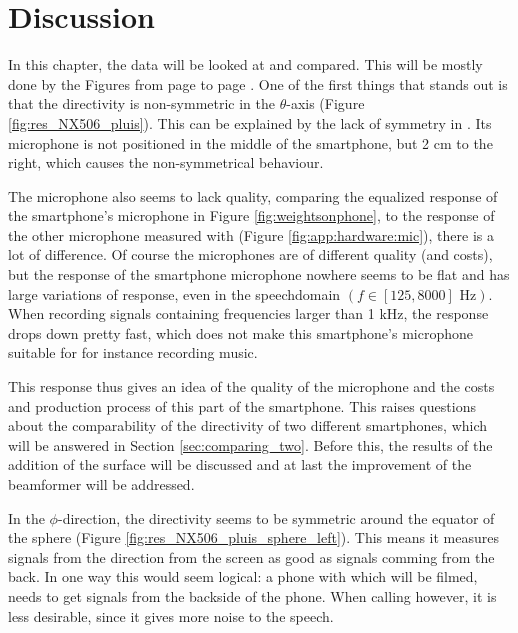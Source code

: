 \section{Discussion}
\label{sec:discussion}

In this chapter, the data will be looked at and compared.
This will be mostly done by the Figures from page \pageref{fig:res_NX506_pluis} to page \pageref{fig:res_NX501_pluis}.
One of the first things that stands out is that the directivity is non-symmetric in the $\theta$-axis (Figure \ref{fig:res_NX506_pluis}).
This can be explained by the lack of symmetry in \nexus.
Its microphone is not positioned in the middle of the smartphone, but 2 cm to the right, which causes the non-symmetrical behaviour.

The microphone also seems to lack quality, comparing the equalized response of the smartphone's microphone in Figure \ref{fig:weightsonphone}, to the response of the other microphone measured with (Figure \ref{fig:app:hardware:mic}), there is a lot of difference.
Of course the microphones are of different quality (and costs), but the response of the smartphone microphone nowhere seems to be flat and has large variations of response, even in the speechdomain $(f\in[125,8000]\text{ Hz})$.
When recording signals containing frequencies larger than 1 kHz, the response drops down pretty fast, which does not make this smartphone's microphone suitable for for instance recording music.

This response thus gives an idea of the quality of the microphone and the costs and production process of this part of the smartphone.
This raises questions about the comparability of the directivity of two different {\nexus} smartphones, which will be answered in Section \ref{sec:comparing_two}.
Before this, the results of the addition of the surface will be discussed and at last the improvement of the beamformer will be addressed.

In the $\phi$-direction, the directivity seems to be symmetric around the equator of the sphere (Figure \ref{fig:res_NX506_pluis_sphere_left}).
This means it measures signals from the direction from the screen as good as signals comming from the back.
In one way this would seem logical: a phone with which will be filmed, needs to get signals from the backside of the phone.
When calling however, it is less desirable, since it gives more noise to the speech.

